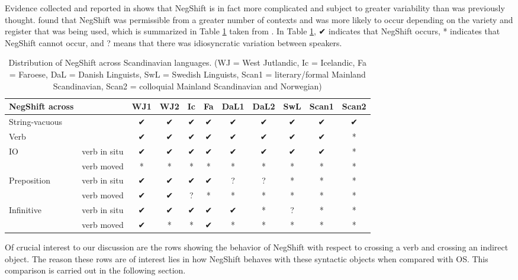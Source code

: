 \documentclass[12pt, letterpaper]{article}
\begin{document}
Evidence collected and reported in \citet{engelsMicrovariationObjectPositions2011,engelsScandinavianNegativeIndefinites2012} shows that NegShift is in fact more complicated and subject to greater variability than was previously thought. \citeauthor{engelsScandinavianNegativeIndefinites2012} found that NegShift was permissible from a greater number of contexts and was more likely to occur depending on the variety and register that was being used, which is summarized in Table \ref{tab:Distribution} taken from \citet{engelsScandinavianNegativeIndefinites2012}. In Table \ref{tab:Distribution}, ✔︎ indicates that NegShift occurs, * indicates that NegShift cannot occur, and ? means that there was idiosyncratic variation between speakers.
\begin{table}[!ht]
	\centering
	\caption{Distribution of NegShift across Scandinavian languages. (WJ = West Jutlandic, Ic = Icelandic, Fa = Faroese, DaL = Danish Linguists, SwL = Swedish Linguists, Scan1 = literary/formal Mainland Scandinavian, Scan2 = colloquial Mainland Scandinavian and Norwegian)}
	\label{tab:Distribution}
\begin{tabular}{llccccccccc}
	\hline 
	NegShift across &  & WJ1 & WJ2 & Ic & Fa & DaL1 & DaL2 & SwL & Scan1 & Scan2 \\ 
	\hline 
	String-vacuous &  & ✔︎ & ✔︎ & ✔︎ & ✔︎ & ✔︎ & ✔︎ & ✔︎ & ✔︎ & ✔︎ \\ 
	Verb &  & ✔︎ & ✔︎ & ✔︎ & ✔︎ & ✔︎ & ✔︎ & ✔︎ & ✔︎ & * \\ 
	IO & verb in situ & ✔︎ & ✔︎ & ✔︎ & ✔︎ & ✔︎ & ✔︎ & ✔︎ & ✔︎ & * \\ 
	& verb moved & * & * & * & * & * & * & * & * & * \\ 
	Preposition & verb in situ & ✔︎ & ✔︎ & ✔︎ & ✔︎ & ? & ? & * & * & * \\ 
	& verb moved & ✔︎ & ✔︎ & ? & * & * & * & * & * & * \\ 
	Infinitive & verb in situ & ✔︎ & ✔︎ & ✔︎ & ✔︎ & ✔︎ & * & ? & * & * \\ 
	& verb moved & ✔︎ & * & * & ✔︎ & * & * & * & * & * \\ 
	\hline 
\end{tabular} 
\end{table}


Of crucial interest to our discussion are the rows showing the behavior of NegShift with respect to crossing a verb and crossing an indirect object.  The reason these rows are of interest lies in how NegShift behaves with these syntactic objects when compared with OS. This comparison is carried out in the following section.
\end{document}
